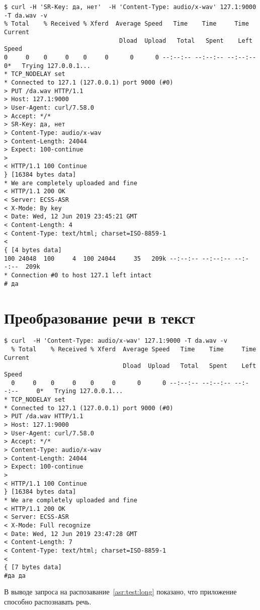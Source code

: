 \begin{lstlisting}[caption={Поиск по ключевым фразам: да, нет}, label={asr:test:short:yes}]
$ curl -H 'SR-Key: да, нет'  -H 'Content-Type: audio/x-wav' 127.1:9000 -T da.wav -v
% Total    % Received % Xferd  Average Speed   Time    Time     Time  Current
                                Dload  Upload   Total   Spent    Left  Speed
0     0    0     0    0     0      0      0 --:--:-- --:--:-- --:--:--     0*   Trying 127.0.0.1...
* TCP_NODELAY set
* Connected to 127.1 (127.0.0.1) port 9000 (#0)
> PUT /da.wav HTTP/1.1
> Host: 127.1:9000
> User-Agent: curl/7.58.0
> Accept: */*
> SR-Key: да, нет
> Content-Type: audio/x-wav
> Content-Length: 24044
> Expect: 100-continue
>
< HTTP/1.1 100 Continue
} [16384 bytes data]
* We are completely uploaded and fine
< HTTP/1.1 200 OK
< Server: ECSS-ASR
< X-Mode: By key
< Date: Wed, 12 Jun 2019 23:45:21 GMT
< Content-Length: 4
< Content-Type: text/html; charset=ISO-8859-1
<
{ [4 bytes data]
100 24048  100     4  100 24044     35   209k --:--:-- --:--:-- --:--:--  209k
* Connection #0 to host 127.1 left intact
# да

\end{lstlisting}

\section{Преобразование речи в текст}
\begin{lstlisting}[caption={Преобразование речи в текст}, label={asr:test:long}]
$ curl  -H 'Content-Type: audio/x-wav' 127.1:9000 -T da.wav -v
  % Total    % Received % Xferd  Average Speed   Time    Time     Time  Current
                                 Dload  Upload   Total   Spent    Left  Speed
  0     0    0     0    0     0      0      0 --:--:-- --:--:-- --:--:--     0*   Trying 127.0.0.1...
* TCP_NODELAY set
* Connected to 127.1 (127.0.0.1) port 9000 (#0)
> PUT /da.wav HTTP/1.1
> Host: 127.1:9000
> User-Agent: curl/7.58.0
> Accept: */*
> Content-Type: audio/x-wav
> Content-Length: 24044
> Expect: 100-continue
>
< HTTP/1.1 100 Continue
} [16384 bytes data]
* We are completely uploaded and fine
< HTTP/1.1 200 OK
< Server: ECSS-ASR
< X-Mode: Full recognize
< Date: Wed, 12 Jun 2019 23:47:28 GMT
< Content-Length: 7
< Content-Type: text/html; charset=ISO-8859-1
<
{ [7 bytes data]
#да да
\end{lstlisting}


В выводе запроса на распозавание~\ref{asr:test:long} показано, что приложение
способно распознавать речь.
